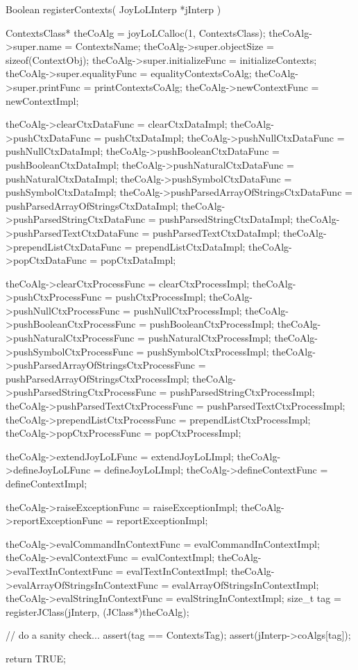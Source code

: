 \startCCode
Boolean registerContexts(
  JoyLoLInterp *jInterp
) {
  ContextsClass* theCoAlg    = 
    joyLoLCalloc(1, ContextsClass);
  theCoAlg->super.name             = ContextsName;
  theCoAlg->super.objectSize       = sizeof(ContextObj);
  theCoAlg->super.initializeFunc   = initializeContexts;
  theCoAlg->super.equalityFunc     = equalityContextsCoAlg;
  theCoAlg->super.printFunc        = printContextsCoAlg;
  theCoAlg->newContextFunc         = newContextImpl;
  
  theCoAlg->clearCtxDataFunc       = clearCtxDataImpl;
  theCoAlg->pushCtxDataFunc        = pushCtxDataImpl;
  theCoAlg->pushNullCtxDataFunc    = pushNullCtxDataImpl;
  theCoAlg->pushBooleanCtxDataFunc = pushBooleanCtxDataImpl;
  theCoAlg->pushNaturalCtxDataFunc = pushNaturalCtxDataImpl;
  theCoAlg->pushSymbolCtxDataFunc  = pushSymbolCtxDataImpl;
  theCoAlg->pushParsedArrayOfStringsCtxDataFunc =
    pushParsedArrayOfStringsCtxDataImpl;
  theCoAlg->pushParsedStringCtxDataFunc =
    pushParsedStringCtxDataImpl;
  theCoAlg->pushParsedTextCtxDataFunc =
    pushParsedTextCtxDataImpl;
  theCoAlg->prependListCtxDataFunc = prependListCtxDataImpl;
  theCoAlg->popCtxDataFunc         = popCtxDataImpl;
  
  theCoAlg->clearCtxProcessFunc    = clearCtxProcessImpl;
  theCoAlg->pushCtxProcessFunc     = pushCtxProcessImpl;
  theCoAlg->pushNullCtxProcessFunc = pushNullCtxProcessImpl;
  theCoAlg->pushBooleanCtxProcessFunc =
    pushBooleanCtxProcessImpl;
  theCoAlg->pushNaturalCtxProcessFunc =
    pushNaturalCtxProcessImpl;
  theCoAlg->pushSymbolCtxProcessFunc =
    pushSymbolCtxProcessImpl;
  theCoAlg->pushParsedArrayOfStringsCtxProcessFunc =
    pushParsedArrayOfStringsCtxProcessImpl;
  theCoAlg->pushParsedStringCtxProcessFunc =
    pushParsedStringCtxProcessImpl;
  theCoAlg->pushParsedTextCtxProcessFunc =
    pushParsedTextCtxProcessImpl;
  theCoAlg->prependListCtxProcessFunc =
    prependListCtxProcessImpl;
  theCoAlg->popCtxProcessFunc      = popCtxProcessImpl;
  
  theCoAlg->extendJoyLoLFunc       = extendJoyLoLImpl;
  theCoAlg->defineJoyLoLFunc       = defineJoyLoLImpl;
  theCoAlg->defineContextFunc      = defineContextImpl;

  theCoAlg->raiseExceptionFunc     = raiseExceptionImpl;
  theCoAlg->reportExceptionFunc    = reportExceptionImpl;
  
  theCoAlg->evalCommandInContextFunc =
    evalCommandInContextImpl;
  theCoAlg->evalContextFunc        = evalContextImpl;
  theCoAlg->evalTextInContextFunc  = evalTextInContextImpl;
  theCoAlg->evalArrayOfStringsInContextFunc =
    evalArrayOfStringsInContextImpl;
  theCoAlg->evalStringInContextFunc =
    evalStringInContextImpl;
  size_t tag =
    registerJClass(jInterp, (JClass*)theCoAlg);

  // do a sanity check...
  assert(tag == ContextsTag);
  assert(jInterp->coAlgs[tag]);

  return TRUE;
}
\stopCCode

